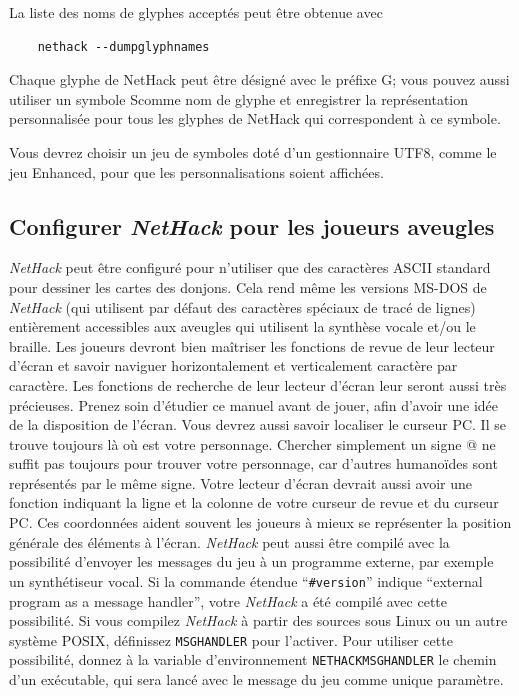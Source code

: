 \documentclass[titlepage]{article}
\begin{document}
La liste des noms de glyphes acceptés peut être obtenue avec
\begin{verbatim}
    nethack --dumpglyphnames
\end{verbatim}
Chaque glyphe de NetHack peut être désigné avec le préfixe G\textunderscore ;
vous pouvez aussi utiliser un symbole S\textunderscore comme nom de glyphe et enregistrer la
représentation personnalisée pour tous les glyphes de NetHack qui correspondent
à ce symbole.

Vous devrez choisir un jeu de symboles doté d'un gestionnaire UTF8, comme le
jeu Enhanced, pour que les personnalisations soient affichées.

\subsection*{Configurer \textit{NetHack} pour les joueurs aveugles}

\textit{NetHack} peut être configuré pour n'utiliser que des caractères ASCII standard pour
dessiner les cartes des donjons. Cela rend même les versions MS-DOS de \textit{NetHack}
(qui utilisent par défaut des caractères spéciaux de tracé de lignes) entièrement
accessibles aux aveugles qui utilisent la synthèse vocale et/ou le braille.
Les joueurs devront bien maîtriser les fonctions de revue de leur lecteur
d'écran et savoir naviguer horizontalement et
verticalement caractère par caractère. Les fonctions de recherche
de leur lecteur d'écran leur seront aussi très précieuses. Prenez soin
d'étudier ce manuel avant de jouer, afin d'avoir une idée de la disposition
de l'écran. Vous devrez aussi savoir localiser le curseur PC. Il se trouve
toujours là où est votre personnage. Chercher simplement un signe @
ne suffit pas toujours pour trouver votre personnage, car d'autres humanoïdes
sont représentés par le même signe. Votre lecteur d'écran devrait aussi avoir une
fonction indiquant la ligne et la colonne de votre curseur de revue et du curseur PC.
Ces coordonnées aident souvent les joueurs à mieux se représenter
la position générale des éléments à l'écran.
\textit{NetHack} peut aussi être compilé avec la possibilité d'envoyer les messages
du jeu à un programme externe, par exemple un synthétiseur vocal. Si
la commande étendue ``\texttt{\#version}'' indique ``external program as a
message handler'', votre \textit{NetHack}
a été compilé avec cette possibilité. Si vous compilez \textit{NetHack}
à partir des sources
sous Linux ou un autre système POSIX, définissez \texttt{MSGHANDLER} pour l'activer.
Pour utiliser
cette possibilité, donnez à la variable d'environnement \texttt{NETHACK\textunderscore MSGHANDLER} le chemin
d'un exécutable, qui sera lancé avec le message du jeu comme
unique paramètre.
\end{document}
